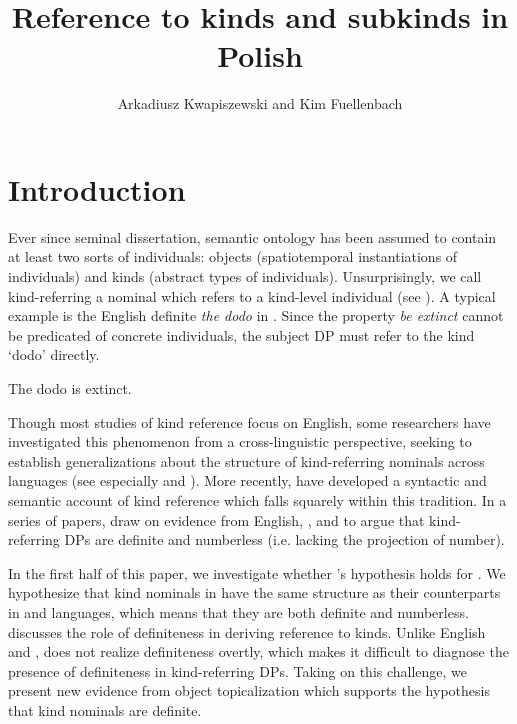 \documentclass[output=paper]{langscibook}
\author{Arkadiusz Kwapiszewski\orcid{0000-0002-2957-0862}\affiliation{University of Oxford} and Kim Fuellenbach\orcid{0000-0003-4836-1617}\affiliation{University of Oxford}}
\title[Reference to kinds and subkinds in Polish]
      {Reference to kinds and subkinds in Polish}
\begin{document}
\maketitle


\section{Introduction}

Ever since  seminal dissertation, semantic ontology has been assumed to contain at least two sorts of individuals: objects (spatiotemporal instantiations of individuals) and kinds (abstract types of individuals). Unsurprisingly, we call kind-referring a nominal which refers to a kind-level individual (see \citealt{Krifka1995}). A typical example is the English definite \textit{the dodo} in . Since the property \textit{be extinct} cannot be predicated of concrete individuals, the subject DP must refer to the kind `dodo' directly.

\ea The dodo is extinct. \label{ex:dodo}
\z

\noindent
Though most studies of kind reference focus on English, some researchers have investigated this phenomenon from a cross-linguistic perspective, seeking to establish generalizations about the structure of kind-referring nominals across languages (see especially \citealt{Chierchia1998} and \citealt{Dayal2004}). More recently, \citeauthor{Borik.Espinal2012} have developed a syntactic and semantic account of kind reference which falls squarely within this tradition. In a series of papers, \cite{Borik.Espinal2012, Borik.Espinal2015, Borik.Espinal2016, Borik.Espinal2018} draw on evidence from English, , and  to argue that kind-referring DPs are definite and numberless (i.e. lacking the projection of number).

In the first half of this paper, we investigate whether \citeauthor{Borik.Espinal2012}'s hypothesis holds for . We hypothesize that kind nominals in  have the same structure as their counterparts in  and  languages, which means that they are both definite and numberless.  discusses the role of definiteness in deriving reference to kinds. Unlike English and ,  does not realize definiteness overtly, which makes it difficult to diagnose the presence of definiteness in kind-referring DPs. Taking on this challenge, we present new evidence from object topicalization which supports the hypothesis that  kind nominals are definite.
\end{document}
